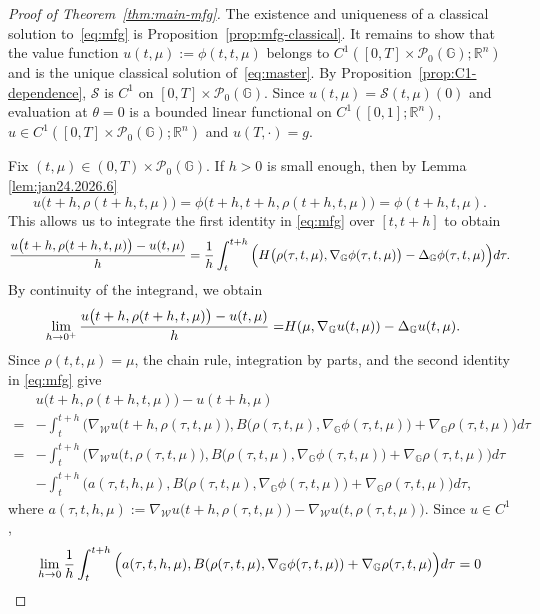 \documentclass[10pt]{article}
\numberwithin{equation}{section}
\newcommand{\cP}{ \mathcal{P}}
\newcommand{\cS}{ \mathcal{S}}
\newcommand{\cW}{ \mathcal{W}}
\newcommand{\R}{\mathbb R}
\def\R{{\mathbb{R}}}
\def\G{\mathbb{G}}
\begin{document}
\begin{proof}[Proof of Theorem~\ref{thm:main-mfg}]
The existence and uniqueness of a classical solution to~\eqref{eq:mfg} is Proposition~\ref{prop:mfg-classical}. It remains to show that the value function $u(t,\mu):=\phi(t,t,\mu)$ belongs to $C^1([0,T]\times\cP_0(\G);\R^n)$ and is the unique classical solution of~\eqref{eq:master}.
By Proposition~\ref{prop:C1-dependence}, $\cS$ is $C^1$ on $[0,T]\times\cP_0(\G)$. Since $u(t,\mu)=\cS(t,\mu)(0)$ and evaluation at $\theta=0$ is a bounded linear functional on $C^1([0,1];\R^n)$, $u\in C^1([0,T]\times\cP_0(\G);\R^n)$ and $u(T,\cdot)=g$.

Fix $(t, \mu) \in (0,T) \times \cP_0(\G).$ If $h>0$ is small enough, then by Lemma \ref{lem:jan24.2026.6} 
\[
u\big(t+h, \rho(t+h, t, \mu)\big)=\phi\big(t+h, t+h, \rho(t+h, t, \mu)\big)= \phi(t+h, t, \mu).
\]
This allows us to integrate the first identity in \eqref{eq:mfg} over $[t, t+h]$ to obtain
\[
{u\big(t+h, \rho(t+h, t, \mu)\big)-u(t, \mu) \over h}={1\over h}\int_t^{t+h} \Big( H\big(\rho(\tau, t, \mu),\nabla_{\G}\phi(\tau, t, \mu)\big)-\Delta_{\G}\phi(\tau, t, \mu)\Big) d\tau.
\]
By continuity of the integrand, we obtain 
\begin{align} 
\lim_{h \to 0^+} {u\big(t+h, \rho(t+h, t, \mu)\big)-u(t, \mu) \over h} 
=& H(\mu,\nabla_{\G}u(t, \mu))-\Delta_{\G}u(t, \mu).  \label{eq:jan24.2026.4}
\end{align}
Since $\rho(t, t, \mu) = \mu$, the chain rule, integration by parts, and the second identity in \eqref{eq:mfg} give
\begin{align}
& u\big(t+h, \rho(t+h, t, \mu)\big)-u(t+h,\mu)\nonumber\\
=&- \int_t^{t+h} \Big( \nabla_\cW u\big(t+h, \rho(\tau, t, \mu)\big), B\big(\rho(\tau, t, \mu),\nabla_{\G}\phi(\tau, t, \mu)\big)+\nabla_{\G}\rho(\tau, t, \mu) \Big)d\tau\nonumber\\
=&- \int_t^{t+h} \Big( \nabla_\cW u\big(t, \rho(\tau, t, \mu)\big), B\big(\rho(\tau, t, \mu),\nabla_{\G}\phi(\tau, t, \mu)\big)+\nabla_{\G}\rho(\tau, t, \mu) \Big)d\tau
\label{eq:jan24.2026.7}\\
&- \int_t^{t+h} \Big(a(\tau, t, h, \mu) , B\big(\rho(\tau, t, \mu),\nabla_{\G}\phi(\tau, t, \mu)\big)+\nabla_{\G}\rho(\tau, t, \mu) \Big)d\tau,\nonumber
\end{align}
where $a(\tau, t, h, \mu):=\nabla_\cW u\big(t+h, \rho(\tau, t, \mu)\big)-\nabla_\cW u\big(t, \rho(\tau, t, \mu)\big)$. Since $u \in C^1$,
\[
\lim_{h \to 0} {1\over h} \int_t^{t+h} \Big(a(\tau, t, h, \mu) , B(\rho(\tau, t, \mu),\nabla_{\G}\phi(\tau, t, \mu))+\nabla_{\G}\rho(\tau, t, \mu) \Big)d\tau=0
\]
\end{proof}
\end{document}
